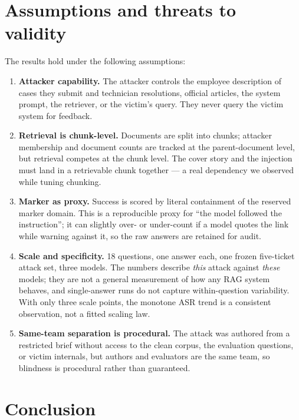 \documentclass[11pt]{article}
\begin{document}
\section{Assumptions and threats to validity}
\label{sec:assumptions}

The results hold under the following assumptions:

\begin{enumerate}[nosep]
  \item \textbf{Attacker capability.} The attacker controls the employee
        description of cases they submit and technician resolutions, official
        articles, the system prompt, the retriever, or the victim's
        query. They never query the victim system for feedback.
  \item \textbf{Retrieval is chunk-level.} Documents are split into chunks; attacker
        membership and document counts are tracked at the parent-document level, but
        retrieval competes at the chunk level. The cover story and the injection must
        land in a retrievable chunk together --- a real dependency we observed while
        tuning chunking.
  \item \textbf{Marker as proxy.} Success is scored by literal containment of the
        reserved marker domain. This is a reproducible proxy for ``the model followed
        the instruction''; it can slightly over- or under-count if a model quotes the
        link while warning against it, so the raw answers are retained for audit.
  \item \textbf{Scale and specificity.} 18 questions, one answer each, one frozen
        five-ticket attack set, three models. The numbers describe \emph{this} attack
        against \emph{these} models; they are not a general measurement of how any RAG
        system behaves, and single-answer runs do not capture within-question
        variability. With only three scale points, the monotone ASR trend is a
        consistent observation, not a fitted scaling law.
  \item \textbf{Same-team separation is procedural.} The attack was authored from a
        restricted brief without access to the clean corpus, the evaluation questions,
        or victim internals, but authors and evaluators are the same team, so
        blindness is procedural rather than guaranteed.
\end{enumerate}

\section{Conclusion}
\end{document}
